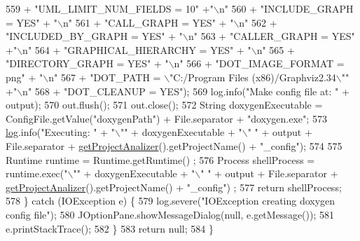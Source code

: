 \begin{DoxyCode}
559                     + \textcolor{stringliteral}{"UML\_LIMIT\_NUM\_FIELDS = 10"} +\textcolor{stringliteral}{"\(\backslash\)n"}
560                     + \textcolor{stringliteral}{"INCLUDE\_GRAPH = YES"} + \textcolor{stringliteral}{"\(\backslash\)n"}
561                     + \textcolor{stringliteral}{"CALL\_GRAPH = YES"} + \textcolor{stringliteral}{"\(\backslash\)n"}
562                     + \textcolor{stringliteral}{"INCLUDED\_BY\_GRAPH = YES"} + \textcolor{stringliteral}{"\(\backslash\)n"}
563                     + \textcolor{stringliteral}{"CALLER\_GRAPH = YES"} +\textcolor{stringliteral}{"\(\backslash\)n"}
564                     + \textcolor{stringliteral}{"GRAPHICAL\_HIERARCHY = YES"} + \textcolor{stringliteral}{"\(\backslash\)n"}
565                     + \textcolor{stringliteral}{"DIRECTORY\_GRAPH = YES"} + \textcolor{stringliteral}{"\(\backslash\)n"}
566                     + \textcolor{stringliteral}{"DOT\_IMAGE\_FORMAT = png"} + \textcolor{stringliteral}{"\(\backslash\)n"}
567                     + \textcolor{stringliteral}{"DOT\_PATH = \(\backslash\)"C:/Program Files (x86)/Graphviz2.34\(\backslash\)""} +\textcolor{stringliteral}{"\(\backslash\)n"}
568                     + \textcolor{stringliteral}{"DOT\_CLEANUP = YES"});
569             log.info(\textcolor{stringliteral}{"Make config file at: "} + output);
570             out.flush();
571             out.close();
572             String doxygenExecutable = ConfigFile.getValue(\textcolor{stringliteral}{"doxygenPath"}) + File.separator + \textcolor{stringliteral}{"doxygen.exe"};
573             \hyperlink{classit_1_1isislab_1_1masonhelperdocumentation_1_1analizer_1_1_global_utility_afc01085ddd5741383afdb4237343c49c}{log}.info(\textcolor{stringliteral}{"Executing: "} + \textcolor{stringliteral}{"\(\backslash\)""} + doxygenExecutable + \textcolor{stringliteral}{"\(\backslash\)" "} + output + File.separator + 
      \hyperlink{classit_1_1isislab_1_1masonhelperdocumentation_1_1analizer_1_1_global_utility_af6bcca0c06ec6fa8c2b2b88f5050914c}{getProjectAnalizer}().getProjectName() + \textcolor{stringliteral}{"\_config"});
574             
575             Runtime runtime = Runtime.getRuntime() ;
576             Process shellProcess = runtime.exec(\textcolor{stringliteral}{"\(\backslash\)""} + doxygenExecutable + \textcolor{stringliteral}{"\(\backslash\)" "} + output + File.separator 
      + \hyperlink{classit_1_1isislab_1_1masonhelperdocumentation_1_1analizer_1_1_global_utility_af6bcca0c06ec6fa8c2b2b88f5050914c}{getProjectAnalizer}().getProjectName() + \textcolor{stringliteral}{"\_config"}) ;
577             \textcolor{keywordflow}{return} shellProcess;
578         \} \textcolor{keywordflow}{catch} (IOException e) \{
579             log.severe(\textcolor{stringliteral}{"IOException creating doxygen config file"});
580             JOptionPane.showMessageDialog(null, e.getMessage());
581             e.printStackTrace();
582         \}
583         \textcolor{keywordflow}{return} null;        
584     \}
\end{DoxyCode}


